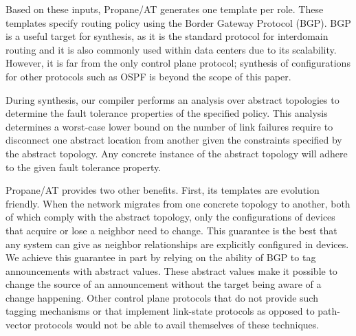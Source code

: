 \documentclass[numbers, 10pt, preprint]{sigplanconf}
\newcommand{\sysname}{{\text{}\small \sf Propane/AT}\xspace}
\begin{document}
Based on these inputs, \sysname generates one template per role. 
These templates specify routing policy using the Border Gateway Protocol (BGP).
BGP is a useful target for synthesis, as it is the standard protocol
for interdomain routing and it is also commonly used
within data centers due to its scalability.  However, it is far from the only control
plane protocol; synthesis of configurations for other protocols such as OSPF is beyond the 
scope of this paper.

During synthesis, our compiler performs an analysis over abstract topologies to determine
the fault tolerance properties of the specified policy.  This analysis determines a worst-case 
lower bound on the number of link failures require to disconnect one abstract location from another 
given the constraints specified by the abstract topology. Any concrete instance of the abstract topology will adhere to the given fault tolerance property.


\sysname provides two other benefits. First, its templates are evolution friendly. 
When the network migrates from
one concrete topology to another, both of which comply with the abstract
topology, only the configurations of devices that acquire or lose a neighbor need to change. 
This guarantee is the best that any system can give as neighbor relationships are explicitly 
configured in devices.  We achieve this guarantee in part by relying on the ability of BGP
to tag announcements with abstract values.  These abstract values make it possible to change
the source of an announcement without the target being aware of a change happening.  Other control
plane protocols that do not provide such tagging mechanisms or that implement link-state protocols as opposed to
path-vector protocols would not be able to avail themselves of these techniques.
\end{document}
